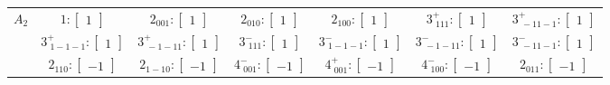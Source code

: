 \documentclass[fleqn,8pt,landscape]{jsarticle}
\begin{document}
\begin{longtable}{ccccccc}
$ A_{2} $ & $ 1:\begin{bmatrix} 1 \end{bmatrix} $ & $ 2{}_{001}:\begin{bmatrix} 1 \end{bmatrix} $ & $ 2{}_{010}:\begin{bmatrix} 1 \end{bmatrix} $ & $ 2{}_{100}:\begin{bmatrix} 1 \end{bmatrix} $ & $ 3^{+}_{\,\,111}:\begin{bmatrix} 1 \end{bmatrix} $ & $ 3^{+}_{\,\,-11-1}:\begin{bmatrix} 1 \end{bmatrix} $ \\
& $ 3^{+}_{\,\,1-1-1}:\begin{bmatrix} 1 \end{bmatrix} $ & $ 3^{+}_{\,\,-1-11}:\begin{bmatrix} 1 \end{bmatrix} $ & $ 3^{-}_{\,\,111}:\begin{bmatrix} 1 \end{bmatrix} $ & $ 3^{-}_{\,\,1-1-1}:\begin{bmatrix} 1 \end{bmatrix} $ & $ 3^{-}_{\,\,-1-11}:\begin{bmatrix} 1 \end{bmatrix} $ & $ 3^{-}_{\,\,-11-1}:\begin{bmatrix} 1 \end{bmatrix} $ \\
& $ 2{}_{110}:\begin{bmatrix} -1 \end{bmatrix} $ & $ 2{}_{1-10}:\begin{bmatrix} -1 \end{bmatrix} $ & $ 4^{-}_{\,\,001}:\begin{bmatrix} -1 \end{bmatrix} $ & $ 4^{+}_{\,\,001}:\begin{bmatrix} -1 \end{bmatrix} $ & $ 4^{-}_{\,\,100}:\begin{bmatrix} -1 \end{bmatrix} $ & $ 2{}_{011}:\begin{bmatrix} -1 \end{bmatrix} $ \\

\end{longtable}
\end{document}

